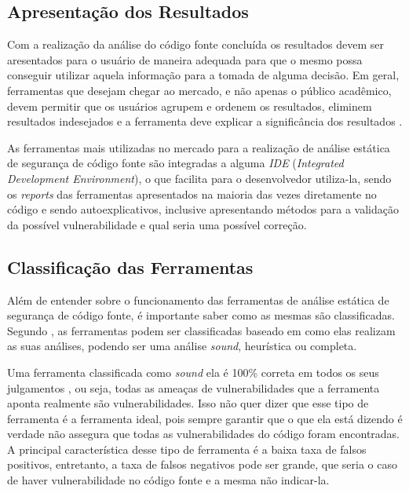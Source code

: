 \subsection{Apresentação dos Resultados}

Com a realização da análise do código fonte concluída os resultados devem ser
aresentados para o usuário de maneira adequada para que o mesmo possa conseguir
utilizar aquela informação para a tomada de alguma decisão. Em geral,
ferramentas que desejam chegar ao mercado, e não apenas o público acadêmico, devem
permitir que os usuários agrupem e ordenem os resultados, eliminem resultados
indesejados e a ferramenta deve explicar a significância dos resultados
\cite{chess&west2007}.

As ferramentas mais utilizadas no mercado para a realização de análise estática
de segurança de código fonte são integradas a alguma \textit{IDE}
(\textit{Integrated Development Environment}), o que facilita para o
desenvolvedor utiliza-la, sendo os \textit{reports} das ferramentas apresentados
na maioria das vezes diretamente no código e sendo autoexplicativos, inclusive
apresentando métodos para a validação da possível vulnerabilidade e qual seria
uma possível correção.


\subsection{Classificação das Ferramentas}\label{sec:classificacaoferramentas}

Além de entender sobre o funcionamento das ferramentas de análise estática de
segurança de código fonte, é importante saber como as mesmas são classificadas.
Segundo , as ferramentas podem ser classificadas baseado
em como elas realizam as suas análises, podendo ser uma análise \textit{sound},
heurística ou completa.

Uma ferramenta classificada como \textit{sound} ela é 100\% correta em todos os
seus julgamentos \cite{paul:2001}, ou seja, todas as ameaças de vulnerabilidades que a
ferramenta aponta realmente são vulnerabilidades. Isso não quer dizer que esse
tipo de ferramenta é a ferramenta ideal, pois sempre garantir que o que ela está
dizendo é verdade não assegura que todas as vulnerabilidades do código foram
encontradas. A principal característica desse tipo de ferramenta é a baixa taxa
de falsos positivos, entretanto, a taxa de falsos negativos pode ser grande, que
seria o caso de haver vulnerabilidade no código fonte e a mesma não indicar-la.

